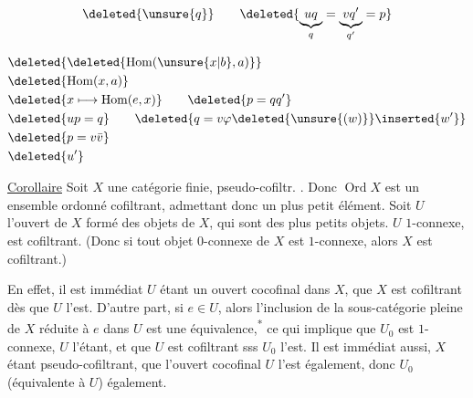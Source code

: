 \[
\deleted{\unsure{q}}\qquad\deleted{\underbrace{uq}_{q}=\underbrace{vq'}_{q'}=p}
\]


\[
\begin{aligned}
&\deleted{\deleted{\mathrm{Hom}(\unsure{x|b},a)}}\\
&\deleted{\mathrm{Hom}(x,a)}\\
&\deleted{x\longmapsto\mathrm{Hom}(e,x)}\qquad\deleted{p=qq'}\\
&\deleted{up=q}\qquad\deleted{q=v\varphi\deleted{\unsure{(w)}}\inserted{w'}}\\
&\deleted{p=v\bar v}\\
&\deleted{u'}
\end{aligned}
\]




\uline{Corollaire} Soit $X$ une catégorie finie, pseudo-cofiltr. . Donc $\operatorname{Ord} X$ est un ensemble ordonné cofiltrant, admettant donc un plus petit élément. Soit $U$ l'ouvert de $X$ formé des objets de $X$, qui sont des plus petits objets.   $U$ $1$-connexe,   est cofiltrant. (Donc si tout objet $0$-connexe de $X$ est $1$-connexe, alors $X$ est cofiltrant.)

En effet, il est immédiat  $U$ étant un ouvert cocofinal dans $X$,  que $X$ est cofiltrant dès que $U$ l'est. D'autre part, si $e\in U$, alors l'inclusion de la sous-catégorie pleine  de $X$ réduite à $e$ dans $U$ est une équivalence,\textsuperscript{*} ce qui implique que $U_0$ est $1$-connexe, $U$ l'étant, et que $U$ est cofiltrant sss $U_0$ l'est.
 Il est immédiat aussi, $X$ étant pseudo-cofiltrant, que l'ouvert cocofinal $U$ l'est également, donc $U_0$ (équivalente à $U$) également.


